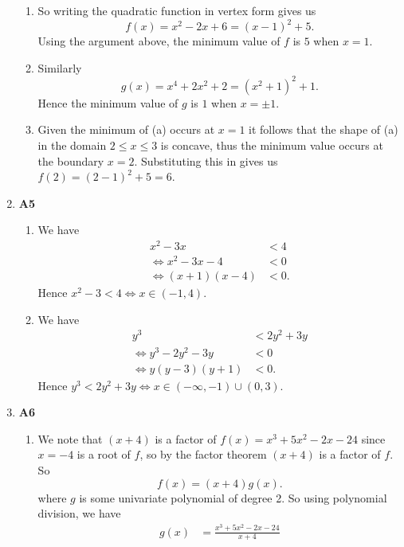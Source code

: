 \documentclass[12pt,oneside]{book}
\begin{document}
\begin{enumerate}
            \begin{enumerate}
            \item So writing the quadratic function in vertex form gives us \[
                f(x) = x^2 - 2x + 6 = (x - 1)^2 + 5
            .\]
            Using the argument above, the minimum value of $f$ is $5$ when $x = 1$.
            \item Similarly \[
                g(x) = x^4 + 2x^2 + 2 = (x^2 + 1)^2 + 1
            .\] Hence the minimum value of $g$ is $1$ when $x = \pm 1$.
            \item Given the minimum of (a) occurs at $x = 1$ it follows that the shape of (a) in the domain $2 \leq x \leq 3$ is concave, thus the minimum value occurs at the boundary $x = 2$. Substituting this in gives us $f(2) = (2 - 1)^2 + 5 = 6$.
        \end{enumerate}
        \item \textbf{A5} \begin{enumerate}
            \item We have \begin{align*}
                x^2 - 3x &< 4 \\
                \iff x^2 - 3x - 4 &< 0 \\
                \iff (x + 1) (x - 4) &< 0.
            \end{align*}
            Hence $x^2 - 3 < 4 \iff x \in (-1, 4)$.
            \item We have \begin{align*}
                y^3 &< 2y^2 + 3y \\
                \iff y^3 - 2y^2 - 3y &< 0 \\
                \iff y(y - 3)(y + 1) &< 0.
            \end{align*}
            Hence $y^3 < 2y^2 + 3y \iff x \in (- \infty, -1) \cup (0,3) $.
        \end{enumerate}
        \item \textbf{A6} \begin{enumerate}
            \item We note that $(x+4)$ is a factor of  $f(x) = x^3 + 5x^2 - 2x -24$ since $x = -4$ is a root of $f$, so by the factor theorem $(x + 4)$ is a factor of $f$. So \[
                f(x) = (x+4)g(x) 
            .\] where $g$ is some univariate polynomial of degree 2. So using polynomial division, we have \begin{align*}
                g(x) &= \frac{x^3 + 5x^2 - 2x - 24}{x + 4} \\

\end{align*}
\end{enumerate}
\end{enumerate}
\end{document}
